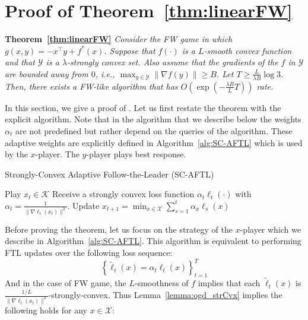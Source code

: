 \documentclass[final,12pt]{colt2018} %
\def\K{\mathcal{K}}
\newcommand{\XX}{\mathcal{X}}
\newcommand{\YY}{\mathcal{Y}}
\begin{document}
\section{Proof of Theorem~\ref{thm:linearFW}} \label{app:linearFW}

\noindent\textbf{Theorem~\ref{thm:linearFW}}
\textit{ 
Consider the FW game in which $g(x,y)= -x^{\top}y + f^{*}(x)$.
Suppose that $f(\cdot)$ is a $L$-smooth convex function
and that $\YY$ is a $\lambda$-strongly convex set. Also assume that the gradients of the $f$ in $\YY$ are bounded away from $0$, i.e., $\max_{y\in\YY}\|\nabla f(y)\|\geq B$. Let $T \geq \frac {L}{\lambda B} \log 3$.
Then, there exists a FW-like algorithm that has $O(\exp(-\frac{\lambda B }{L} T))$ rate.
}


In this section, we give a proof of . Let us first restate the theorem with the explicit algorithm.
Note that in the algorithm that we describe below the weights $\alpha_t$ are not predefined but rather depend on the queries of the algorithm. These adaptive weights are explicitly defined in Algorithm~\ref{alg:SC-AFTL} which is used by the $x$-player. The $y$-player plays best response.


\begin{algorithm}[h] 
  \caption{Strongly-Convex Adaptive Follow-the-Leader (SC-AFTL)}
  \label{alg:SC-AFTL}
  \begin{algorithmic}[1]
    \STATE Play $x_t \in \K$
    \STATE Receive a strongly convex loss function $\alpha_t \ell_{t}(\cdot)$ with $\alpha_t = \frac{1}{\| \nabla \ell_t(x_t) \|^2} $.
    \STATE Update $x_{t+1} = \min_{x\in \XX} \sum_{s=1}^t \alpha_x \ell_s(x) $  
   \ENDFOR 
  \end{algorithmic}
\end{algorithm}

Before proving the theorem,
let us focus on the strategy of the $x$-player which we describe in Algorithm~\ref{alg:SC-AFTL}.
This algorithm  is equivalent to performing FTL updates  over the following loss sequence:
 $$\left\{\tilde{\ell}_t(x) =\alpha_t \ell_t(x) \right\}_{t=1}^T$$ 
And in the case of FW game, the $L$-smoothness of $f$ implies  that each $\tilde{\ell}_t(x)$ is $\frac{1/L}{\| \nabla \ell_t(x_t)\|^2}$-strongly-convex. 
Thus Lemma~\ref{lemma:ogd_strCvx} implies the following holds for any $x\in\XX$:

\end{document}
